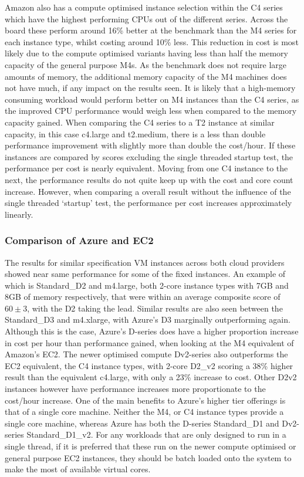 \documentclass{llncs}
\begin{document}
Amazon also has a compute optimised instance selection within the C4 series which have the highest performing CPUs out of the different series. Across the board these perform around 16\% better at the benchmark than the M4 series for each instance type, whilst costing around 10\% less. This reduction in cost is most likely due to the compute optimised variants having less than half the memory capacity of the general purpose M4s. As the benchmark does not require large amounts of memory, the additional memory capacity of the M4 machines does not have much, if any impact on the results seen. It is likely that a high-memory consuming workload would perform better on M4 instances than the C4 series, as the improved CPU performance would weigh less when compared to the memory capacity gained. When comparing the C4 series to a T2 instance at similar capacity, in this case c4.large and t2.medium, there is a less than double performance improvement with slightly more than double the cost/hour. If these instances are compared by scores excluding the single threaded startup test, the performance per cost is nearly equivalent. Moving from one C4 instance to the next, the performance results do not quite keep up with the cost and core count increase. However, when comparing a overall result without the influence of the single threaded `startup' test, the performance per cost increases approximately linearly.


\subsubsection{Comparison of Azure and EC2}

The results for similar specification VM instances across both cloud providers showed near same performance for some of the fixed instances. An example of which is Standard\_D2 and m4.large, both 2-core instance types with 7GB and 8GB of memory respectively, that were within an average composite score of $60\pm3$, with the D2 taking the lead. Similar results are also seen between the Standard\_D3 and m4.xlarge, with Azure's D3 marginally outperforming again. Although this is the case, Azure's D-series does have a higher proportion increase in cost per hour than performance gained, when looking at the M4 equivalent of Amazon's EC2. The newer optimised compute Dv2-series also outperforms the EC2 equivalent, the C4 instance types, with 2-core D2\_v2 scoring a 38\% higher result than the equivalent c4.large, with only a 23\% increase to cost. Other D2v2 instances however have performance increases more proportionate to the cost/hour increase. One of the main benefits to Azure's higher tier offerings is that of a single core machine. Neither the M4, or C4 instance types provide a single core machine, whereas Azure has both the D-series Standard\_D1 and Dv2-series Standard\_D1\_v2. For any workloads that are only designed to run in a single thread, if it is preferred that these run on the newer compute optimised or general purpose EC2 instances, they should be batch loaded onto the system to make the most of available virtual cores.
\end{document}
